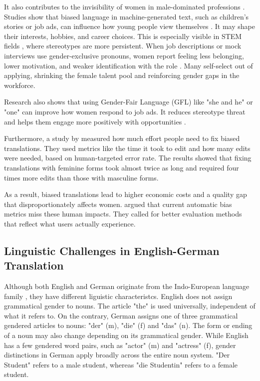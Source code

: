         It also contributes to the invisibility of women in male-dominated professions \parencite{kapplAreAllSpanish2025}. Studies show that biased language in machine-generated text, such as children’s stories or job ads, can influence how young people view themselves \parencite{soundararajanInvestigatingGenderBias2024,kapplAreAllSpanish2025}. It may shape their interests, hobbies, and career choices. This is especially visible in STEM fields \parencite{pratesAssessingGenderBias2019}, where stereotypes are more persistent. When job descriptions or mock interviews use gender-exclusive pronouns, women report feeling less belonging, lower motivation, and weaker identification with the role \parencite{godsilEffectsGenderRoles2016}. Many self-select out of applying, shrinking the female talent pool and reinforcing gender gaps in the workforce.

        Research also shows that using Gender-Fair Language (GFL) like "she and he" or "one" can improve how women respond to job ads. It reduces stereotype threat and helps them engage more positively with opportunities \parencite{godsilEffectsGenderRoles2016}.

        Furthermore, a study by \textcite{savoldiWhatHarmQuantifying2024} measured how much effort people need to fix biased translations. They used metrics like the time it took to edit and how many edits were needed, based on human-targeted error rate. The results showed that fixing translations with feminine forms took almost twice as long and required four times more edits than those with masculine forms.

        As a result, biased translations lead to higher economic costs and a quality gap that disproportionately affects women. \textcite{savoldiWhatHarmQuantifying2024} argued that current automatic bias metrics miss these human impacts. They called for better evaluation methods that reflect what users actually experience.

    \subsection{Linguistic Challenges in English-German Translation}
        Although both English and German originate from the Indo-European language family \parencite{baldiEnglishIndoEuropeanLanguage2008}, they have different liguistic characteristcs. English does not assign grammatical gender to nouns. The article "the" is used universally, independent of what it refers to. On the contrary, German assigns one of three grammatical gendered articles to nouns: "der" (m), "die" (f) and "das" (n). The form or ending of a noun may also change depending on its grammatical gender. While English has a few gendered word pairs, such as "actor" (m) and "actress" (f), gender distinctions in German apply broadly across the entire noun system. "Der Student" refers to a male student, whereas "die Studentin" refers to a female student. 

